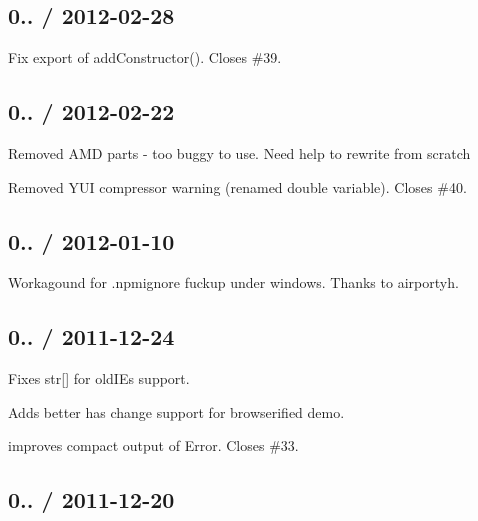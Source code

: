 \subsection*{0.. / 2012-\/02-\/28 }


\begin{DoxyItemize}
\item Fix export of {\ttfamily add\+Constructor()}. Closes \#39.
\end{DoxyItemize}

\subsection*{0.. / 2012-\/02-\/22 }


\begin{DoxyItemize}
\item Removed A\+M\+D parts -\/ too buggy to use. Need help to rewrite from scratch
\item Removed Y\+U\+I compressor warning (renamed {\ttfamily double} variable). Closes \#40.
\end{DoxyItemize}

\subsection*{0.. / 2012-\/01-\/10 }


\begin{DoxyItemize}
\item Workagound for .npmignore fuckup under windows. Thanks to airportyh.
\end{DoxyItemize}

\subsection*{0.. / 2011-\/12-\/24 }


\begin{DoxyItemize}
\item Fixes str\mbox{[}\mbox{]} for old\+I\+Es support.
\item Adds better has change support for browserified demo.
\item improves compact output of Error. Closes \#33.
\end{DoxyItemize}

\subsection*{0.. / 2011-\/12-\/20 }


